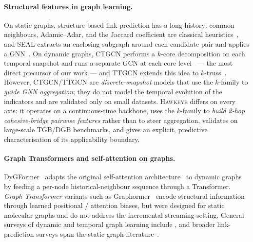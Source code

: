 \documentclass[sigconf,nonacm,review]{acmart}
\newcommand{\method}{\textsc{Hawkeye}\xspace}
\begin{document}
\paragraph{Structural features in graph learning.}
On static graphs, structure-based link prediction has a long history: common
neighbours, Adamic--Adar, and the Jaccard coefficient are classical
heuristics~\cite{liben2007linkpred}, and SEAL extracts an enclosing subgraph
around each candidate pair and applies a GNN~\cite{zhang2018seal}. On dynamic
graphs, CTGCN performs a $k$-core decomposition on each temporal snapshot and
runs a separate GCN at each core level~\cite{chen2020ctgcn} --- the most direct
precursor of our work --- and TTGCN extends this idea to
$k$-truss~\cite{ttgcn2024}. However, CTGCN/TTGCN are \emph{discrete-snapshot}
models that use the $k$-family to \emph{guide GNN aggregation}; they do not
model the temporal evolution of the indicators and are validated only on small
datasets. \method differs on every axis: it operates on a continuous-time
backbone, uses the $k$-family to \emph{build 2-hop cohesive-bridge pairwise
features} rather than to steer aggregation, validates on large-scale TGB/DGB
benchmarks, and gives an explicit, predictive characterisation of its
applicability boundary.

\paragraph{Graph Transformers and self-attention on graphs.}
DyGFormer~\cite{yu2023dygformer} adapts the original self-attention
architecture~\cite{vaswani2017attention} to dynamic graphs by feeding a
per-node historical-neighbour sequence through a Transformer.
\emph{Graph Transformer} variants such as
Graphormer~\cite{ying2021graphormer} encode structural information through
learned positional / attention biases, but were designed for static
molecular graphs and do not address the incremental-streaming setting.
General surveys of dynamic and temporal graph learning include
\cite{kazemi2020survey,skarding2021dtdg}, and broader link-prediction
surveys span the static-graph
literature~\cite{liben2007linkpred,lu2011linkpred,kumar2020linkpred}.
\end{document}
